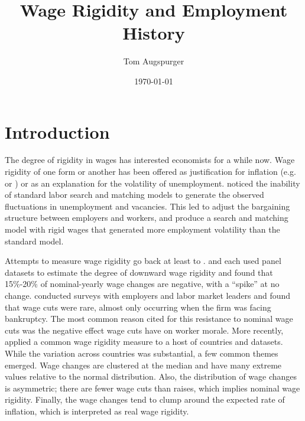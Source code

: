 \documentclass[11pt]{article}
\title{Wage Rigidity and Employment History}
\author{Tom Augspurger}
\date{\today}
\begin{document}
\maketitle




\section{Introduction}
\label{sec:intro}

The degree of rigidity in wages has interested economists for a while now.
Wage rigidity of one form or another has been offered as justification for inflation (e.g. \cite{tobin_1972} or \cite{akerlof_dickens_perry_1996}) or as an explanation for the volatility of unemployment.
\cite{shimer_2005} noticed the inability of standard labor search and matching models to generate the observed fluctuations in unemployment and vacancies.
This led \cite{hall_milgrom_2008} to adjust the bargaining structure between employers and workers, and produce a search and matching model with rigid wages that generated more employment volatility than the standard model.

Attempts to measure wage rigidity go back at least to \cite{dunlop_1938}.
\cite{mclaughlin_1994} and \cite{card_hyslop_1997} each used panel datasets to estimate the degree of downward wage rigidity and found that 15\%-20\% of nominal-yearly wage changes are negative, with a ``spike'' at no change.
\cite{bewley_1999} conducted surveys with employers and labor market leaders and found that wage cuts were rare, almost only occurring when the firm was facing bankruptcy.
The most common reason cited for this resistance to nominal wage cuts was the negative effect wage cuts have on worker morale.
More recently, \cite{dickens_et_al_2006} applied a common wage rigidity measure to a host of countries and datasets.
While the variation across countries was substantial, a few common themes emerged.
Wage changes are clustered at the median and have many extreme values relative to the normal distribution.
Also, the distribution of wage changes is asymmetric; there are fewer wage cuts than raises, which implies nominal wage rigidity.
Finally, the wage changes tend to clump around the expected rate of inflation, which is interpreted as real wage rigidity.
\end{document}
